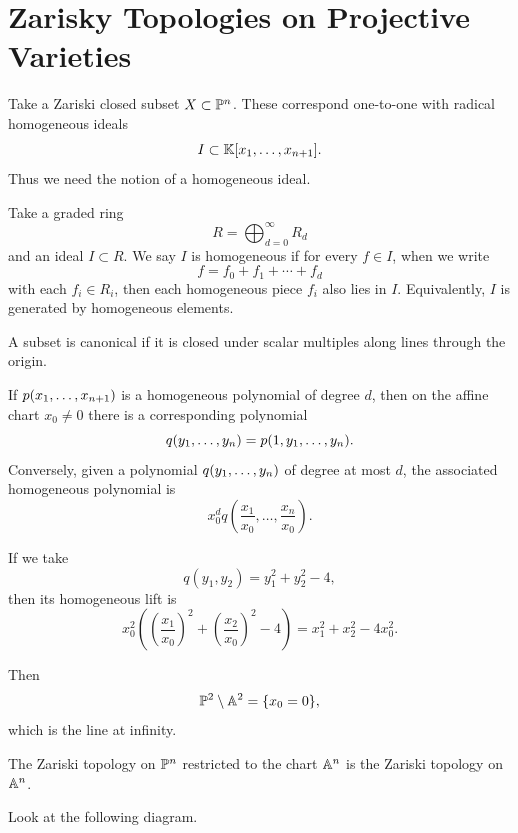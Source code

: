 
\section{Zarisky Topologies on Projective Varieties}

Take a Zariski closed subset $X\subset \pp^n$.
These correspond one-to-one with radical homogeneous ideals
\[
    I\subset \kk[\reptiln{x}{n+1}].
\]
Thus we need the notion of a homogeneous ideal.

\begin{definition}
    Take a graded ring
    \[
        R = \bigoplus_{d=0}^{\infty} R_d
    \]
    and an ideal $I\subset R$.
    We say $I$ is homogeneous if for every $f\in I$, when we write
    \[
        f = f_0 + f_1 + \cdots + f_d
    \]
    with each $f_i\in R_i$, then each homogeneous piece $f_i$ also lies in $I$.
    Equivalently, $I$ is generated by homogeneous elements.
\end{definition}

\begin{definition}[Canonical]
    A subset is canonical if it is closed under scalar multiples along lines through the origin.
\end{definition}

\begin{lemma*}{
    If $p(\reptiln{x}{n+1})$ is a homogeneous polynomial of degree $d$, then on the affine chart $x_0\neq 0$ there is a corresponding polynomial
    \[
        q(\reptiln{y}{n}) = p(1,\reptiln{y}{n}).
    \]
    Conversely, given a polynomial $q(\reptiln{y}{n})$ of degree at most $d$, the associated homogeneous polynomial is
    \[
        x_0^d q\left(\frac{x_1}{x_0},\ldots,\frac{x_n}{x_0}\right).
    \]
}
\end{lemma*}

If we take
\[
    q(y_1,y_2) = y_1^2 + y_2^2 - 4,
\]
then its homogeneous lift is
\[
    x_0^2\left(\left(\frac{x_1}{x_0}\right)^2 + \left(\frac{x_2}{x_0}\right)^2 - 4\right)
    = x_1^2 + x_2^2 - 4x_0^2.
\]

Then
\[
    \pp^2\setminus \aa^2 = \{x_0 = 0\},
\]
which is the line at infinity.

\begin{lemma*}{
    The Zariski topology on $\pp^n$ restricted to the chart $\aa^n$ is the Zariski topology on $\aa^n$.
}
\end{lemma*}

\begin{remark}
    Look at the following diagram.
\end{remark}

